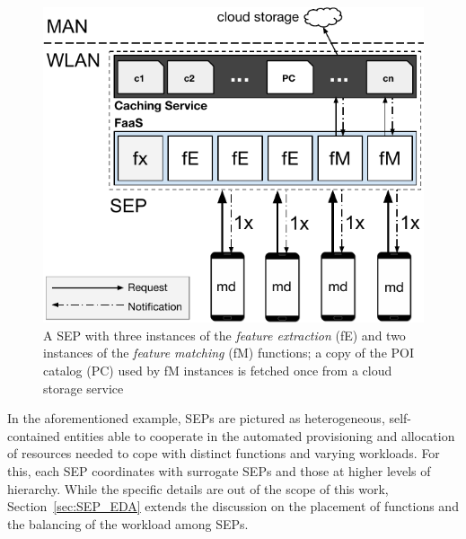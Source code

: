 \begin{figure}[bp]
	\centering
	\includegraphics[width=0.97\linewidth]{Figs/Mobile_Computation_Offloading_Caching.pdf}
	\caption{A SEP with three instances of the \textit{feature extraction} (fE) and two instances of the \textit{feature matching} (fM) functions; a copy of the POI catalog (PC) used by fM instances is fetched once from a cloud storage service} 
	\label{fig:Mobile_Computation_Offloading_Caching}
\end{figure}

In the aforementioned example, SEPs are pictured as heterogeneous, self-contained entities able to cooperate in the automated provisioning and allocation of resources needed to cope with distinct functions and varying workloads. For this, each SEP coordinates %
with surrogate SEPs and those at higher levels of hierarchy. While the specific details are out of the scope of this work, Section~\ref{sec:SEP_EDA} extends the discussion on the placement of functions and the balancing of the workload among SEPs.




